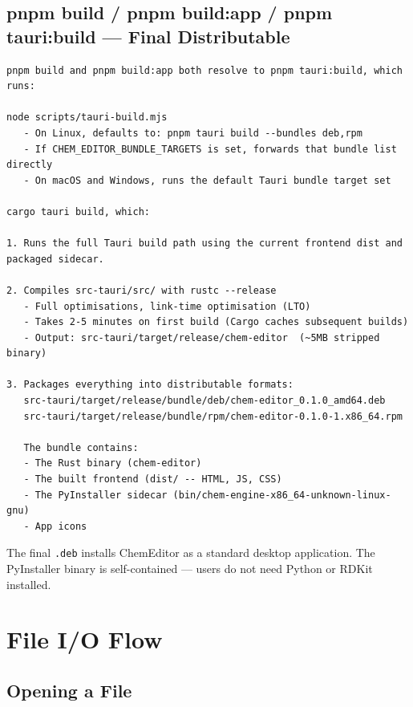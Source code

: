 \documentclass[11pt,a4paper]{article}
\begin{document}
\subsection{pnpm build / pnpm build:app / pnpm tauri:build --- Final Distributable}

\begin{lstlisting}[language={}]
pnpm build and pnpm build:app both resolve to pnpm tauri:build, which runs:

node scripts/tauri-build.mjs
   - On Linux, defaults to: pnpm tauri build --bundles deb,rpm
   - If CHEM_EDITOR_BUNDLE_TARGETS is set, forwards that bundle list directly
   - On macOS and Windows, runs the default Tauri bundle target set

cargo tauri build, which:

1. Runs the full Tauri build path using the current frontend dist and packaged sidecar.

2. Compiles src-tauri/src/ with rustc --release
   - Full optimisations, link-time optimisation (LTO)
   - Takes 2-5 minutes on first build (Cargo caches subsequent builds)
   - Output: src-tauri/target/release/chem-editor  (~5MB stripped binary)

3. Packages everything into distributable formats:
   src-tauri/target/release/bundle/deb/chem-editor_0.1.0_amd64.deb
   src-tauri/target/release/bundle/rpm/chem-editor-0.1.0-1.x86_64.rpm

   The bundle contains:
   - The Rust binary (chem-editor)
   - The built frontend (dist/ -- HTML, JS, CSS)
   - The PyInstaller sidecar (bin/chem-engine-x86_64-unknown-linux-gnu)
   - App icons
\end{lstlisting}

The final \texttt{.deb} installs ChemEditor as a standard desktop application. The
PyInstaller binary is self-contained --- users do not need Python or RDKit installed.

\section{File I/O Flow}
\label{sec:fileio}

\subsection{Opening a File}
\end{document}
